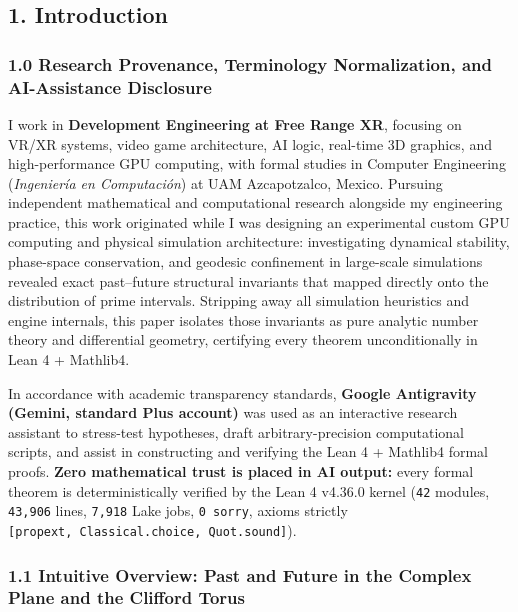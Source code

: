 \documentclass[
  11pt,
]{article}
\begin{document}
\subsection{1. Introduction}\label{introduction}

\subsubsection{1.0 Research Provenance, Terminology Normalization, and
AI-Assistance
Disclosure}\label{research-provenance-terminology-normalization-and-ai-assistance-disclosure}

I work in \textbf{Development Engineering at Free Range XR}, focusing on
VR/XR systems, video game architecture, AI logic, real-time 3D graphics,
and high-performance GPU computing, with formal studies in Computer
Engineering (\emph{Ingeniería en Computación}) at UAM Azcapotzalco,
Mexico. Pursuing independent mathematical and computational research
alongside my engineering practice, this work originated while I was
designing an experimental custom GPU computing and physical simulation
architecture: investigating dynamical stability, phase-space
conservation, and geodesic confinement in large-scale simulations
revealed exact past--future structural invariants that mapped directly
onto the distribution of prime intervals. Stripping away all simulation
heuristics and engine internals, this paper isolates those invariants as
pure analytic number theory and differential geometry, certifying every
theorem unconditionally in Lean 4 + Mathlib4.

In accordance with academic transparency standards, \textbf{Google
Antigravity (Gemini, standard Plus account)} was used as an interactive
research assistant to stress-test hypotheses, draft arbitrary-precision
computational scripts, and assist in constructing and verifying the Lean
4 + Mathlib4 formal proofs. \textbf{Zero mathematical trust is placed in
AI output:} every formal theorem is deterministically verified by the
Lean 4 v4.36.0 kernel (\texttt{42} modules, \texttt{43,906} lines,
\texttt{7,918} Lake jobs, \texttt{0\ sorry}, axioms strictly
\texttt{{[}propext,\ Classical.choice,\ Quot.sound{]}}).

\subsubsection{1.1 Intuitive Overview: Past and Future in the Complex
Plane and the Clifford
Torus}\label{intuitive-overview-past-and-future-in-the-complex-plane-and-the-clifford-torus}
\end{document}
